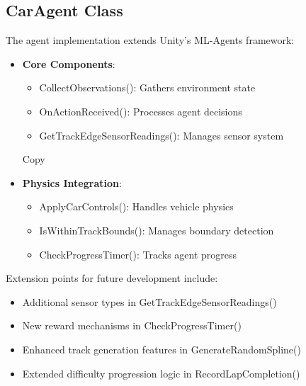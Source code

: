 \documentclass[10pt,twocolumn]{article}
\begin{document}
\subsection{CarAgent Class}
The agent implementation extends Unity's ML-Agents framework:
\begin{itemize}
\item \textbf{Core Components}:
\begin{itemize}
\item CollectObservations(): Gathers environment state
\item OnActionReceived(): Processes agent decisions
\item GetTrackEdgeSensorReadings(): Manages sensor system
\end{itemize}
Copy\item \textbf{Physics Integration}:
\begin{itemize}
    \item ApplyCarControls(): Handles vehicle physics
    \item IsWithinTrackBounds(): Manages boundary detection
    \item CheckProgressTimer(): Tracks agent progress
\end{itemize}
\end{itemize}
Extension points for future development include:
\begin{itemize}
\item Additional sensor types in GetTrackEdgeSensorReadings()
\item New reward mechanisms in CheckProgressTimer()
\item Enhanced track generation features in GenerateRandomSpline()
\item Extended difficulty progression logic in RecordLapCompletion()
\end{itemize}
\printbibliography
\end{document}
